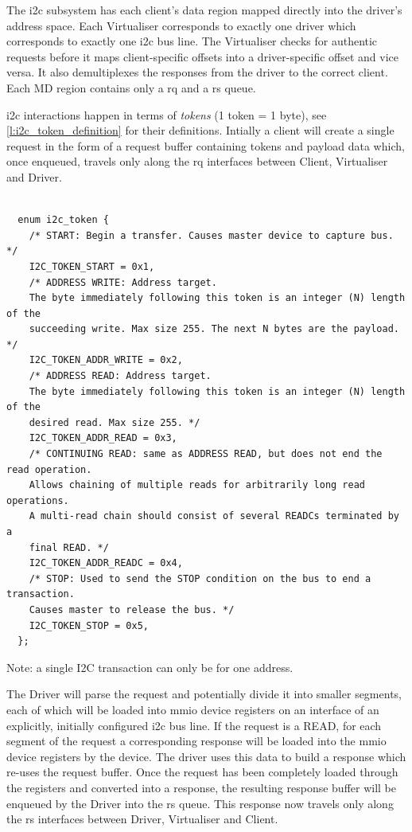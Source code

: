 \documentclass[a4paper,12pt]{report}
\begin{document}
The \gls{i2c} subsystem has each client's data region mapped directly into the driver's address space.
Each Virtualiser corresponds to exactly one driver which corresponds to exactly one \gls{i2c} bus line.
The Virtualiser checks for authentic requests before it maps client-specific offsets into a driver-specific offset and vice versa.
It also demultiplexes the responses from the driver to the correct client.
Each MD region contains only a \gls{rq} and a \gls{rs} queue.

\gls{i2c} interactions happen in terms of \emph{tokens} (1 token = 1 byte), see
\autoref{l:i2c_token_definition} for their definitions.
Intially a client will create a single request in the form of a request buffer containing tokens
and payload data which, once enqueued, travels only along the \gls{rq} interfaces between Client, Virtualiser and Driver.

\begin{lstlisting}[gobble=2,firstline=2,float=th,
  label={l:i2c_token_definition},
  caption={I2C token definitions.}]

  enum i2c_token {
    /* START: Begin a transfer. Causes master device to capture bus. */
    I2C_TOKEN_START = 0x1,
    /* ADDRESS WRITE: Address target.
    The byte immediately following this token is an integer (N) length of the
    succeeding write. Max size 255. The next N bytes are the payload. */
    I2C_TOKEN_ADDR_WRITE = 0x2,
    /* ADDRESS READ: Address target.
    The byte immediately following this token is an integer (N) length of the
    desired read. Max size 255. */
    I2C_TOKEN_ADDR_READ = 0x3,
    /* CONTINUING READ: same as ADDRESS READ, but does not end the read operation.
    Allows chaining of multiple reads for arbitrarily long read operations.
    A multi-read chain should consist of several READCs terminated by a
    final READ. */
    I2C_TOKEN_ADDR_READC = 0x4,
    /* STOP: Used to send the STOP condition on the bus to end a transaction.
    Causes master to release the bus. */
    I2C_TOKEN_STOP = 0x5,
  };
\end{lstlisting}

Note: a single I2C transaction can only be for one address.

The Driver will parse the request and potentially divide it into smaller segments,
each of which will be loaded into \gls{mmio} device registers
on an interface of an explicitly, initially configured \gls{i2c} bus line.
If the request is a READ, for each segment of the request a corresponding response
will be loaded into the \gls{mmio} device registers by the device.
The driver uses this data to build a response which re-uses the request buffer.
Once the request has been completely loaded through the registers and converted into a response,
the resulting response buffer will be enqueued by the Driver into the \gls{rs} queue.
This response now travels only along the \gls{rs} interfaces between Driver, Virtualiser and Client.
\end{document}
